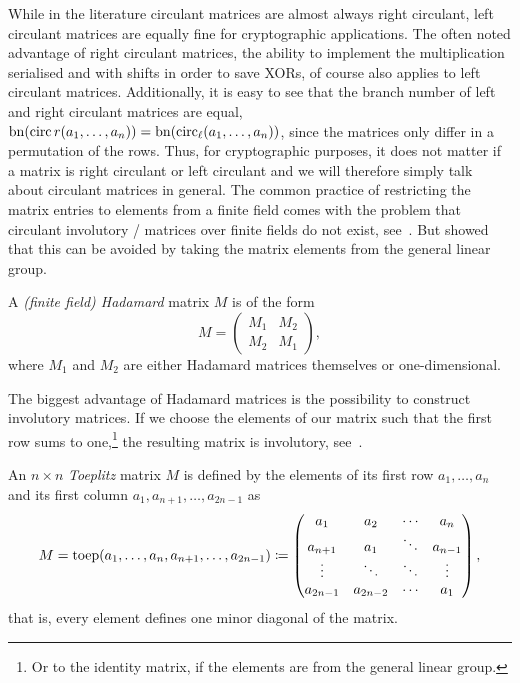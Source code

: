 While in the literature circulant matrices are almost always right circulant, left circulant matrices are equally fine for cryptographic applications.
The often noted advantage of right circulant matrices, the ability to implement the multiplication serialised and with shifts in order to save XORs, of course also applies to left circulant matrices.
Additionally, it is easy to see that the branch number of left and right circulant matrices are equal, $\mathrm{bn}(\operatorname{circ}{r}(a_1, \ldots, a_n)) = \mathrm{bn}(\operatorname{circ}_{\ell}(a_1, \ldots, a_n))$, since the matrices only differ in a permutation of the rows. Thus, for cryptographic purposes, it does not matter if a matrix is right circulant or left circulant and we will therefore simply talk about circulant matrices in general.
The common practice of restricting the matrix entries to elements from a finite field comes with the problem that circulant involutory \MDS/ matrices over finite fields do not exist, see~\cite{IJNSEC:NakAbr09}.
But \textcite{FSE:LiWan16} showed that this can be avoided by taking the matrix elements from the general linear group.

\begin{definition}
    A \emph{(finite field) Hadamard} matrix $M$ is of the form
    \begin{equation*}
        M = \begin{pmatrix} M_1 & M_2 \\ M_2 & M_1 \end{pmatrix},
    \end{equation*}
    where $M_1$ and $M_2$ are either Hadamard matrices themselves or one-dim\-en\-sio\-nal.
\end{definition}

The biggest advantage of Hadamard matrices is the possibility to construct involutory matrices.
If we choose the elements of our matrix such that the first row sums to one,\footnote{%
    Or to the identity matrix, if the elements are from the general linear group.
} the resulting matrix is involutory, see~\cite{AFRICACRYPT:GupRay13}.

\begin{definition}
    An $n \times n$ \emph{Toeplitz} matrix $M$ is defined by the elements of its first row $a_1, \ldots, a_n$ and its first column $a_1, a_{n+1}, \ldots, a_{2n-1}$ as
    \begin{equation*}
        M = \operatorname{toep}(a_1, \ldots, a_n, a_{n+1}, \ldots, a_{2n-1}) \coloneqq \begin{pmatrix}
            a_1      & a_2      & \cdots & a_n     \\
            a_{n+1}  & a_1      & \ddots & a_{n-1} \\
            \vdots   & \ddots   & \ddots & \vdots  \\
            a_{2n-1} & a_{2n-2} & \cdots & a_1     \\
        \end{pmatrix},
    \end{equation*}
    that is, every element defines one minor diagonal of the matrix.
\end{definition}

